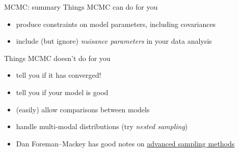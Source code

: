 \documentclass[compress,t]{beamer}
\begin{document}
\begin{frame}{MCMC: summary}
  Things MCMC can do for you
  \begin{itemize}
  \item produce constraints on model parameters, including covariances
  \item include (but ignore) \emph{nuisance parameters} in your data analysis
  \end{itemize}
  
  Things MCMC doesn't do for you
  \begin{itemize}
  \item tell you if it has converged!
  \item tell you if your model is good
  \item (easily) allow comparisons between models
  \item handle multi-modal distributions (try \emph{nested sampling})
  \item Dan Foreman--Mackey has good notes on \href{https://github.com/LSSTC-DSFP/LSSTC-DSFP-Sessions/blob/master/Session10/Day2/AdvancedSampling.ipynb}{\alert{advanced sampling methods}}
  \end{itemize}
\end{frame}
\end{document}
